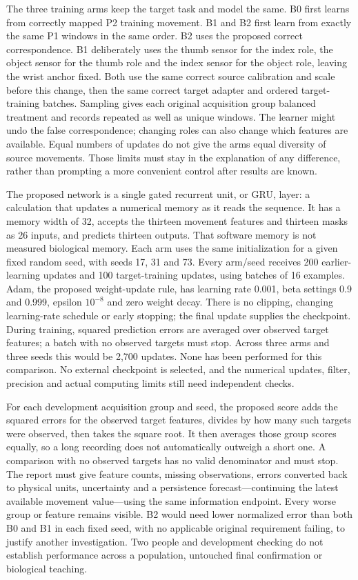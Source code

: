 The three training arms keep the target task and model the same. B0 first learns from correctly mapped P2 training movement. B1 and B2 first learn from exactly the same P1 windows in the same order. B2 uses the proposed correct correspondence. B1 deliberately uses the thumb sensor for the index role, the object sensor for the thumb role and the index sensor for the object role, leaving the wrist anchor fixed. Both use the same correct source calibration and scale before this change, then the same correct target adapter and ordered target-training batches. Sampling gives each original acquisition group balanced treatment and records repeated as well as unique windows. The learner might undo the false correspondence; changing roles can also change which features are available. Equal numbers of updates do not give the arms equal diversity of source movements. Those limits must stay in the explanation of any difference, rather than prompting a more convenient control after results are known.

The proposed network is a single gated recurrent unit, or GRU, layer: a calculation that updates a numerical memory as it reads the sequence. It has a memory width of 32, accepts the thirteen movement features and thirteen masks as 26 inputs, and predicts thirteen outputs. That software memory is not measured biological memory. Each arm uses the same initialization for a given fixed random seed, with seeds 17, 31 and 73. Every arm/seed receives 200 earlier-learning updates and 100 target-training updates, using batches of 16 examples. Adam, the proposed weight-update rule, has learning rate 0.001, beta settings 0.9 and 0.999, epsilon $10^{-8}$ and zero weight decay. There is no clipping, changing learning-rate schedule or early stopping; the final update supplies the checkpoint. During training, squared prediction errors are averaged over observed target features; a batch with no observed targets must stop. Across three arms and three seeds this would be 2,700 updates. None has been performed for this comparison. No external checkpoint is selected, and the numerical updates, filter, precision and actual computing limits still need independent checks.

For each development acquisition group and seed, the proposed score adds the squared errors for the observed target features, divides by how many such targets were observed, then takes the square root. It then averages those group scores equally, so a long recording does not automatically outweigh a short one. A comparison with no observed targets has no valid denominator and must stop. The report must give feature counts, missing observations, errors converted back to physical units, uncertainty and a persistence forecast---continuing the latest available movement value---using the same information endpoint. Every worse group or feature remains visible. B2 would need lower normalized error than both B0 and B1 in each fixed seed, with no applicable original requirement failing, to justify another investigation. Two people and development checking do not establish performance across a population, untouched final confirmation or biological teaching.

